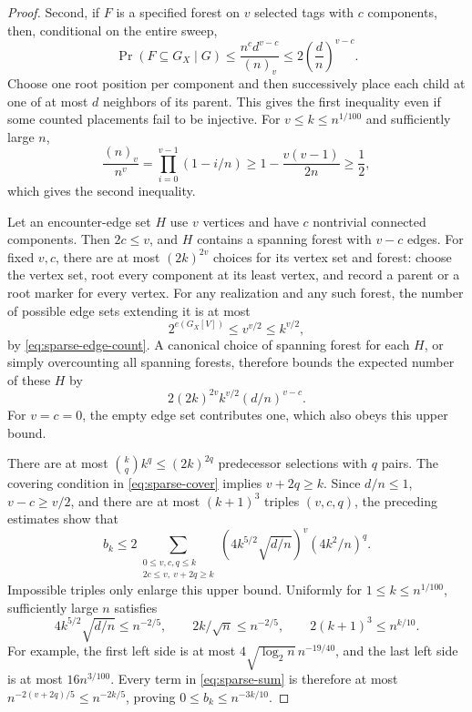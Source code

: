 \begin{proof}
Second, if $F$ is a specified forest on $v$ selected tags with $c$
components, then, conditional on the entire sweep,
\begin{equation}
\label{eq:sparse-forest-probability}
 \Pr(F\subseteq G_X\mid G)
 \le\frac{n^cd^{v-c}}{(n)_v}
 \le2\left(\frac dn\right)^{v-c}.
\end{equation}
Choose one root position per component and then successively place
each child at one of at most $d$ neighbors of its parent. This gives
the first inequality even if some counted placements fail to be
injective. For $v\le k\le n^{1/100}$ and sufficiently large $n$,
\[
 \frac{(n)_v}{n^v}
 =\prod_{i=0}^{v-1}(1-i/n)
 \ge1-\frac{v(v-1)}{2n}\ge\frac12,
\]
which gives the second inequality.

Let an encounter-edge set $H$ use $v$ vertices and have $c$ nontrivial
connected components. Then $2c\le v$, and $H$ contains a spanning
forest with $v-c$ edges. For fixed $v,c$, there are at most
$(2k)^{2v}$ choices for its vertex set and forest: choose the vertex
set, root every component at its least vertex, and record a parent
or a root marker for every vertex. For any realization and any such
forest, the number of possible edge sets extending it is at most
\[
 2^{e(G_X[V])}\le v^{v/2}\le k^{v/2},
\]
by \eqref{eq:sparse-edge-count}. A canonical choice of spanning
forest for each $H$, or simply overcounting all spanning forests,
therefore bounds the expected number of these $H$ by
\[
 2(2k)^{2v}k^{v/2}(d/n)^{v-c}.
\]
For $v=c=0$, the empty edge set contributes one, which also obeys
this upper bound.

There are at most $\binom{k}{q}k^q\le(2k)^{2q}$ predecessor
selections with $q$ pairs. The covering condition in
\eqref{eq:sparse-cover} implies $v+2q\ge k$. Since $d/n\le1$,
$v-c\ge v/2$, and there are at most $(k+1)^3$ triples $(v,c,q)$,
the preceding estimates show that
\begin{equation}
\label{eq:sparse-sum}
 b_k\le 2\sum_{\substack{0\le v,c,q\le k\\
                         2c\le v,\ v+2q\ge k}}
       \left(4k^{5/2}\sqrt{d/n}\right)^v
       \left(4k^2/n\right)^q.
\end{equation}
Impossible triples only enlarge this upper bound. Uniformly for
$1\le k\le n^{1/100}$, sufficiently large $n$ satisfies
\[
 4k^{5/2}\sqrt{d/n}\le n^{-2/5},\qquad
 2k/\sqrt n\le n^{-2/5},\qquad
 2(k+1)^3\le n^{k/10}.
\]
For example, the first left side is at most
$4\sqrt{\log_2n}\,n^{-19/40}$, and the last left side is at most
$16n^{3/100}$. Every term in \eqref{eq:sparse-sum} is therefore at
most $n^{-2(v+2q)/5}\le n^{-2k/5}$, proving
$0\le b_k\le n^{-3k/10}$.


\end{proof}
